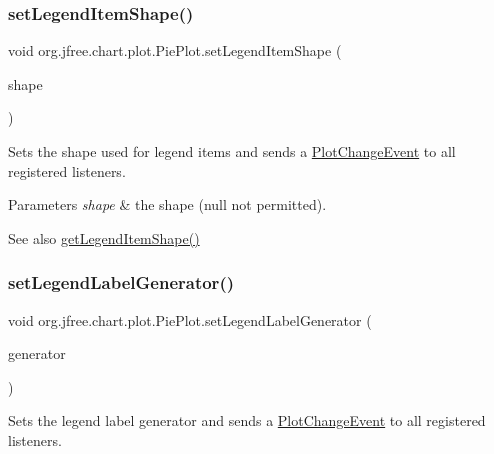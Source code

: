 \subsubsection{\texorpdfstring{set\+Legend\+Item\+Shape()}{setLegendItemShape()}}
{\footnotesize\ttfamily void org.\+jfree.\+chart.\+plot.\+Pie\+Plot.\+set\+Legend\+Item\+Shape (\begin{DoxyParamCaption}\item[{Shape}]{shape }\end{DoxyParamCaption})}

Sets the shape used for legend items and sends a \mbox{\hyperlink{}{Plot\+Change\+Event}} to all registered listeners.


\begin{DoxyParams}{Parameters}
{\em shape} & the shape ({\ttfamily null} not permitted).\\
\hline
\end{DoxyParams}
\begin{DoxySeeAlso}{See also}
\mbox{\hyperlink{classorg_1_1jfree_1_1chart_1_1plot_1_1_pie_plot_a1ad79d0ab422bb702082bc5bde4ff8e2}{get\+Legend\+Item\+Shape()}} 
\end{DoxySeeAlso}
\mbox{\label{classorg_1_1jfree_1_1chart_1_1plot_1_1_pie_plot_a254e74c5936f13ce22a9b0b1392deb7e}} 
\subsubsection{\texorpdfstring{set\+Legend\+Label\+Generator()}{setLegendLabelGenerator()}}
{\footnotesize\ttfamily void org.\+jfree.\+chart.\+plot.\+Pie\+Plot.\+set\+Legend\+Label\+Generator (\begin{DoxyParamCaption}\item[{\mbox{\hyperlink{interfaceorg_1_1jfree_1_1chart_1_1labels_1_1_pie_section_label_generator}{Pie\+Section\+Label\+Generator}}}]{generator }\end{DoxyParamCaption})}

Sets the legend label generator and sends a \mbox{\hyperlink{}{Plot\+Change\+Event}} to all registered listeners.


